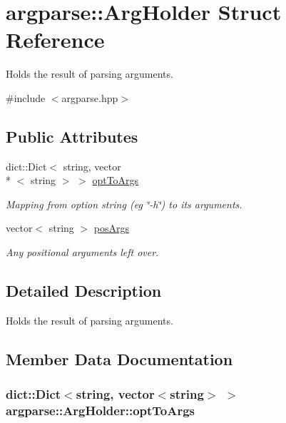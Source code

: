 \hypertarget{structargparse_1_1_arg_holder}{\section{argparse\-:\-:Arg\-Holder Struct Reference}
\label{structargparse_1_1_arg_holder}
}


Holds the result of parsing arguments.  




{\ttfamily \#include $<$argparse.\-hpp$>$}

\subsection*{Public Attributes}
\begin{DoxyCompactItemize}
\item 
dict\-::\-Dict$<$ string, vector\\*
$<$ string $>$ $>$ \hyperlink{structargparse_1_1_arg_holder_a47515881e73e90ca90adebc128305cdb}{opt\-To\-Args}
\begin{DoxyCompactList}\small\item\em Mapping from option string (eg \char`\"{}-\/h\char`\"{}) to its arguments. \end{DoxyCompactList}\item 
vector$<$ string $>$ \hyperlink{structargparse_1_1_arg_holder_a3154d09426a4270992d6b54cc1eb2927}{pos\-Args}
\begin{DoxyCompactList}\small\item\em Any positional arguments left over. \end{DoxyCompactList}\end{DoxyCompactItemize}


\subsection{Detailed Description}
Holds the result of parsing arguments. 



\subsection{Member Data Documentation}
\hypertarget{structargparse_1_1_arg_holder_a47515881e73e90ca90adebc128305cdb}{
\subsubsection[{opt\-To\-Args}]{\setlength{\rightskip}{0pt plus 5cm}dict\-::\-Dict$<$string, vector$<$string$>$ $>$ {\bf argparse\-::\-Arg\-Holder\-::opt\-To\-Args}}}\label{structargparse_1_1_arg_holder_a47515881e73e90ca90adebc128305cdb}


